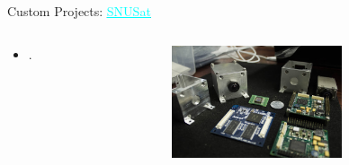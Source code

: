 \begin{frame}{Custom Projects: \href{http://www.madeinepal.com/2016/03/complete-guide-to-designing-camera.html}{\textcolor{cyan}{\underline{SNUSat}}}}

    \begin{columns}[t]
        \begin{column}[t]{0.6\textwidth}
            \begin{itemize}
                \item .
            \end{itemize}
        \end{column}
        \begin{column}[t]{0.5\textwidth}
            \begin{figure}[!ht]
                \begin{center}
                    \includegraphics[width=5cm]{figures/snucam}
                \end{center}
            \end{figure}
        \end{column}
    \end{columns}

\end{frame}